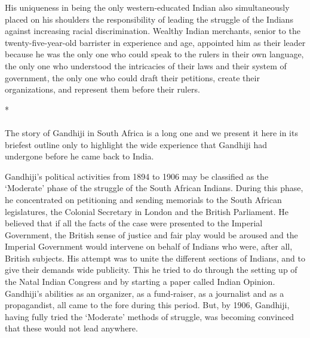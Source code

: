 His uniqueness in being the only western-educated Indian also simultaneously placed on his shoulders the responsibility of leading the struggle of the Indians against increasing racial discrimination. Wealthy Indian merchants, senior to the twenty-five-year-old barrister in experience and age, appointed him as their leader because he was the only one who could speak to the rulers in their own language, the only one who understood the intricacies of their laws and their system of government, the only one who could draft their petitions, create their organizations, and represent them before their rulers.

\begin{center}*\end{center}

\paragraph*{}


The story of Gandhiji in South Africa is a long one and we present it here in its briefest outline only to highlight the wide experience that Gandhiji had undergone before he came back to India.

Gandhiji's political activities from 1894 to 1906 may be classified as the `Moderate' phase of the struggle of the South African Indians. During this phase, he concentrated on petitioning and sending memorials to the South African legislatures, the Colonial Secretary in London and the British Parliament. He believed that if all the facts of the case were presented to the Imperial Government, the British sense of justice and fair play would be aroused and the Imperial Government would intervene on behalf of Indians who were, after all, British subjects. His attempt was to unite the different sections of Indians, and to give their demands wide publicity. This he tried to do through the setting up of the Natal Indian Congress and by starting a paper called Indian Opinion. Gandhiji's abilities as an organizer, as a fund-raiser, as a journalist and as a propagandist, all came to the fore during this period. But, by 1906, Gandhiji, having fully tried the `Moderate' methods of struggle, was becoming convinced that these would not lead anywhere.

